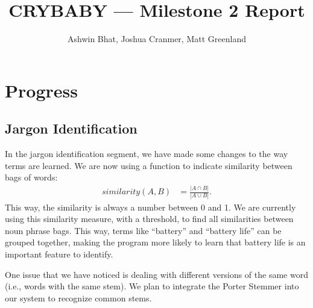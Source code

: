 \documentclass{article}
\title{CRYBABY --- Milestone 2 Report}
\author{Ashwin Bhat, Joshua Cranmer, Matt Greenland}
\begin{document}
\maketitle
\tableofcontents

\section{Progress} %

\subsection{Jargon Identification} %

In the jargon identification segment, we have made some changes to the way terms are learned.  We are now using a function to indicate similarity between bags of words:\begin{align*}
	similarity(A, B) &= \frac{|A\cap B|}{|A\cup B|}.
\end{align*}This way, the similarity is always a number between 0 and 1.  We are currently using this similarity measure, with a threshold, to find all similarities between noun phrase bags.  This way, terms like ``battery'' and ``battery life'' can be grouped together, making the program more likely to learn that battery life is an important feature to identify.

One issue that we have noticed is dealing with different versions of the same word (i.e., words with the same stem).  We plan to integrate the Porter Stemmer \cite{porter} into our system to recognize common stems.



\tocsection


\end{document}
